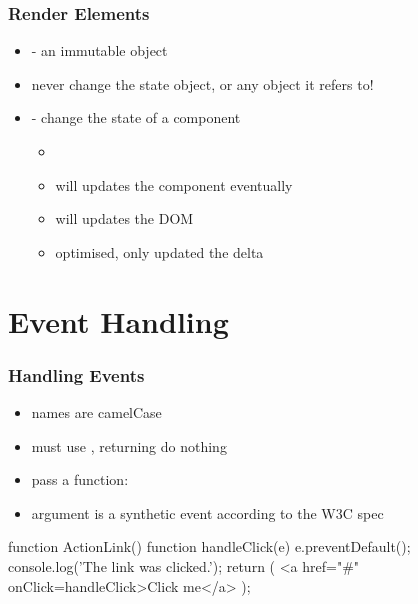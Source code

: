 \begin{frame}[fragile] \frametitle{Render Elements}
\begin{itemize}
\item {} - an immutable object
\item never change the state object, or any object it refers to!
\item {} - change the state of a component
\begin{itemize}
  \item {}
  \item will updates the component eventually
  \item will updates the DOM
  \item optimised, only updated the delta
\end{itemize}
\end{itemize}
\end{frame}

\section{Event Handling}
\begin{frame}[fragile] \frametitle{Handling Events}
\begin{itemize}
  \item names are camelCase
  \item must use , returning  do nothing
  \item pass a function: 
  \item argument is a synthetic event according to the W3C spec
\end{itemize}
\begin{CodeBox}{}
function ActionLink() {
  function handleClick(e) {
    e.preventDefault();
    console.log('The link was clicked.');
  }
  return (
    <a href="#" onClick={handleClick}>Click me</a>
  );
}
\end{CodeBox}
\end{frame}

